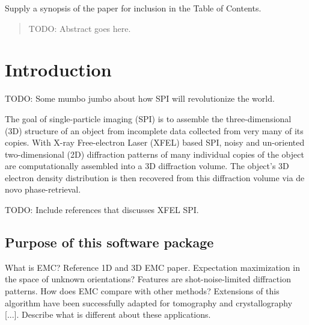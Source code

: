 \documentclass[]{iucr}              %
\begin{document}

\maketitle                        %

\begin{synopsis}
Supply a synopsis of the paper for inclusion in the Table of Contents.
\end{synopsis}

\begin{abstract}
TODO: Abstract goes here.
\end{abstract}



\section{Introduction}
TODO: Some mumbo jumbo about how SPI will revolutionize the world.

The goal of single-particle imaging (SPI) is to assemble the three-dimensional (3D) structure of an object from incomplete data collected from very many of its copies. With X-ray Free-electron Laser (XFEL) based SPI, noisy and un-oriented two-dimensional (2D) diffraction patterns of many individual copies of the object are computationally assembled into a 3D diffraction volume. The object's 3D electron density distribution is then recovered from this diffraction volume via de novo phase-retrieval. 

TODO: Include references that discusses XFEL SPI.

\subsection{Purpose of this software package}
What is EMC? Reference 1D and 3D EMC paper. Expectation maximization in the space of unknown orientations?
Features are shot-noise-limited diffraction patterns.
How does EMC compare with other methods?
Extensions of this algorithm have been successfully adapted for tomography and crystallography [...]. Describe what is different about these applications. 
\end{document}
